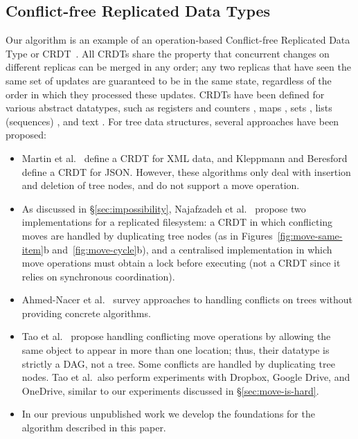 \documentclass[sigplan,anonymous]{acmart}
\begin{document}
\subsection{Conflict-free Replicated Data Types}

Our algorithm is an example of an operation-based Conflict-free Replicated Data Type or CRDT~\cite{Shapiro:2011wy,Shapiro:2011un,Burckhardt:2014ft}.
All CRDTs share the property that concurrent changes on different replicas can be merged in any order; any two replicas that have seen the same set of updates are guaranteed to be in the same state, regardless of the order in which they processed these updates.
CRDTs have been defined for various abstract datatypes, such as registers and counters \cite{Shapiro:2011wy,Shapiro:2011un}, maps \cite{Baquero:2016iv,Kleppmann:2016ve}, sets \cite{Bieniusa:2012wu,Bieniusa:2012gt}, lists (sequences) \cite{Roh:2011dw,Nedelec:2013ky}, and text \cite{Preguica:2009fz,Weiss:2010hx}.
For tree data structures, several approaches have been proposed:
\begin{itemize}
    \item Martin et al.~\cite{Martin:2010ih} define a CRDT for XML data, and Kleppmann and Beresford~\cite{Kleppmann:2016ve} define a CRDT for JSON.
        However, these algorithms only deal with insertion and deletion of tree nodes, and do not support a move operation.
    \item As discussed in \S\ref{sec:impossibility}, Najafzadeh et al.~\cite{Najafzadeh:2017vk,Najafzadeh:2018bw} propose two implementations for a replicated filesystem: a CRDT in which conflicting moves are handled by duplicating tree nodes (as in Figures~\ref{fig:move-same-item}b and~\ref{fig:move-cycle}b), and a centralised implementation in which move operations must obtain a lock before executing (not a CRDT since it relies on synchronous coordination).
    \item Ahmed-Nacer et al.~\cite{AhmedNacer:2012us} survey approaches to handling conflicts on trees without providing concrete algorithms.
    \item Tao et al.~\cite{Tao:2015gd} propose handling conflicting move operations by allowing the same object to appear in more than one location; thus, their datatype is strictly a DAG, not a tree.
        Some conflicts are handled by duplicating tree nodes.
        Tao et al.\ also perform experiments with Dropbox, Google Drive, and OneDrive, similar to our experiments discussed in \S\ref{sec:move-is-hard}.
    \item In our previous unpublished work \cite{ExtendedVersion} we develop the foundations for the algorithm described in this paper.
\end{itemize}
\end{document}

